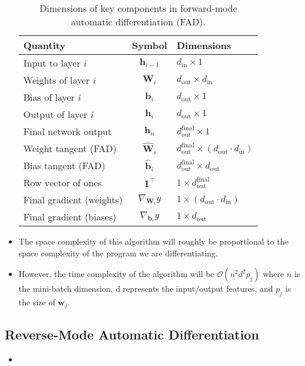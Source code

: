 \documentclass{article}
\newcommand{\mbf}[1]{\mathbf{#1}}
\begin{document}
\begin{itemize}
\begin{itemize}
\end{itemize}

\begin{table}[H]
\caption{Dimensions of key components in forward-mode automatic differentiation (FAD).}
\centering
\renewcommand{\arraystretch}{1.3}
\begin{tabular}{l c l}
\textbf{Quantity} & \textbf{Symbol} & \textbf{Dimensions} \\
\hline
Input to layer $i$        & $\mathbf{h}_{i-1}$            & $d_{\text{in}} \times 1$ \\
Weights of layer $i$      & $\mathbf{W}_i$                & $d_{\text{out}} \times d_{\text{in}}$ \\
Bias of layer $i$         & $\mathbf{b}_i$                & $d_{\text{out}} \times 1$ \\
Output of layer $i$       & $\mathbf{h}_i$                & $d_{\text{out}} \times 1$ \\
Final network output      & $\mathbf{h}_n$                & $d_{\text{out}}^{\text{final}} \times 1$ \\
\hline
Weight tangent (FAD)      & $\widehat{\mathbf{W}}_i$      & $d_{\text{out}}^{\text{final}} \times (d_{\text{out}} \cdot d_{\text{in}})$ \\
Bias tangent (FAD)        & $\widehat{\mathbf{b}}_i$      & $d_{\text{out}}^{\text{final}} \times d_{\text{out}}$ \\
Row vector of ones        & $\mathbf{1}^\top$             & $1 \times d_{\text{out}}^{\text{final}}$ \\
Final gradient (weights)  & $\nabla_{\mathbf{W}_i} y$     & $1 \times (d_{\text{out}} \cdot d_{\text{in}})$ \\
Final gradient (biases)   & $\nabla_{\mathbf{b}_i} y$     & $1 \times d_{\text{out}}$ \\
\end{tabular}
\end{table}
\item The space complexity of this algorithm will roughly be proportional to the space complexity of the program we are differentiating.
\item However, the time complexity of the algorithm will be $\mathcal{O}(n^2d^2p_j)$ where $n$ is the mini-batch dimension, d represents the input/output features, and $p_j$ is the size of $\mbf{w}_j$.
\end{itemize}
\subsection{Reverse-Mode Automatic Differentiation}
\begin{itemize}
    \item 
\end{itemize}
\end{document}
